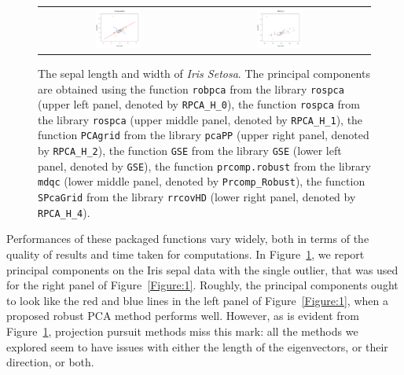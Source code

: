 \documentclass[ss]{imsart}
\theoremstyle{Example}
\begin{document}
\begin{figure}
\begin{center}
\begin{tabular}{ccc}
\includegraphics[width=0.3\textwidth]{./RobustPCA_Figures/Iris_Sepal_PCA_Out_PRRobust} &
\includegraphics[width=0.3\textwidth]{./RobustPCA_Figures/Iris_Sepal_PCA_Out_H4} \\
\end{tabular}
\end{center}
\caption{The sepal length and width of \textit{Iris Setosa}. The principal components are obtained using 
the function \texttt{robpca} from the library \texttt{rospca}
(upper left panel, denoted by \texttt{RPCA\_H\_0}), 
the function \texttt{rospca} from the library \texttt{rospca} 
(upper middle panel, denoted by \texttt{RPCA\_H\_1}), 
the function \texttt{PCAgrid} from the library \texttt{pcaPP} 
(upper right panel, denoted by \texttt{RPCA\_H\_2}), 
the function \texttt{GSE} from the library \texttt{GSE} 
(lower left panel, denoted by \texttt{GSE}), 
the function \texttt{prcomp.robust} from the library \texttt{mdqc} 
(lower middle panel, denoted by \texttt{Prcomp\_Robust}), 
the function \texttt{SPcaGrid} from the library \texttt{rrcovHD}
(lower right panel, denoted by \texttt{RPCA\_H\_4}). 
}
\label{Figure:PP_PCA}
\end{figure}
%
Performances of these packaged functions vary widely, both in terms of the quality of results and time taken for computations. In Figure~\ref{Figure:PP_PCA}, we report principal components on the Iris sepal data with the single outlier, that was used for the right panel of Figure~\ref{Figure:1}. Roughly, the principal components ought to look like the red and blue lines in the left panel of Figure~\ref{Figure:1}, when a proposed robust PCA method performs well. However, as is evident from Figure~\ref{Figure:PP_PCA}, projection pursuit methods miss this mark: all the methods we explored seem to have issues with either the length of the eigenvectors, or their direction, or both. 
\end{document}
